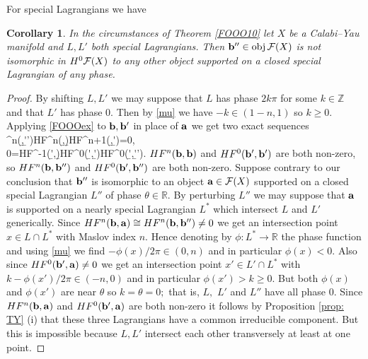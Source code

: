\documentclass{article}
\theoremstyle{plain}%
\newtheorem{cor}[thm]{Corollary}
\theoremstyle{definition}
\numberwithin{equation}{section}
\numberwithin{figure}{section}
\def\ea#1\ea{\begin{align}#1\end{align}}
\def\eq{\eqref}
\def\l{\label}
\def\ge{\geqslant}
\def\cF{{\mathbin{\cal F}}}
\def\R{{\mathbin{\mathbb R}}}
\def\Z{{\mathbin{\mathbb Z}}}
\def\th{\theta}
\def\ph{\phi}
\begin{document}
For special Lagrangians we have
\begin{cor}\l{cor: non-special}
In the circumstances of Theorem \ref{FOOO10} let $X$ be a Calabi--Yau manifold and $L,L'$ both special Lagrangians. Then $\b''\in \obj \cF(X)$ is not isomorphic in $H^0\cF(X)$ to any other object supported on a closed special Lagrangian of any phase.
\end{cor}
\begin{proof}
By shifting $L,L'$ we may suppose that $L$ has phase $2k \pi$ for some $k\in\Z$ and that $L'$ has phase $0.$
Then by \eq{mu} we have $-k\in(1-n,1)$ so $k\ge0.$
Applying \eq{FOOOex} to ${\mathbf{b}},{\mathbf{b}}'$ in place of ${\bf a}$ we get two exact sequences
\ea HF^n(\b,\b'')\to HF^n(\b,\b)\to HF^{n+1}(\b,\b')=0,\\
0=HF^{-1}(\b',\b)\to HF^0(\b',\b')\to HF^0(\b',\b'').\ea
On the other hand $HF^n({\mathbf{b}},{\mathbf{b}})$ and $HF^0({\mathbf{b}}',{\mathbf{b}}')$ are both non-zero, so
$HF^n({\mathbf{b}},{\mathbf{b}}'')$ and $HF^0({\mathbf{b}}',{\mathbf{b}}'')$ are both non-zero.
Suppose contrary to our conclusion that ${\mathbf{b}}''$ is isomorphic to an object ${\bf a}\in\cF(X)$ supported on a closed special Lagrangian $L''$ of phase $\th\in\R.$
By perturbing $L''$ we may suppose that ${\bf a}$ is supported on a nearly special Lagrangian $L^*$ which intersect $L$ and $L'$ generically.
Since $HF^n({\mathbf{b}},{\bf a})\cong HF^n({\mathbf{b}},{\mathbf{b}}'')\ne0$ we get an intersection point $x\in L\cap L^*$ with Maslov index $n.$
Hence denoting by $\ph:L^*\to\R$ the phase function and using \eq{mu} we find
$-\ph(x)/2\pi\in(0,n)$ and in particular $\ph(x)<0.$
Also since $HF^0({\mathbf{b}}',{\bf a})\ne0$ we get an intersection point $x'\in L'\cap L^*$ with
$k-\ph(x')/2\pi\in (-n,0)$ and in particular $\ph(x')>k\ge0.$
But both $\ph(x)$ and $\ph(x')$ are near $\th$ so $k=\th=0;$ that is, $L,$ $L'$ and $L''$ have all phase $0.$
Since $HF^n({\mathbf{b}},{\bf a})$ and $HF^0({\mathbf{b}}',{\bf a})$ are both non-zero it follows by Proposition \ref{prop: TY} (i)
that these three Lagrangians have a common irreducible component.
But this is impossible because $L,L'$ intersect each other transversely at least at one point. 
\end{proof}
\end{document}
